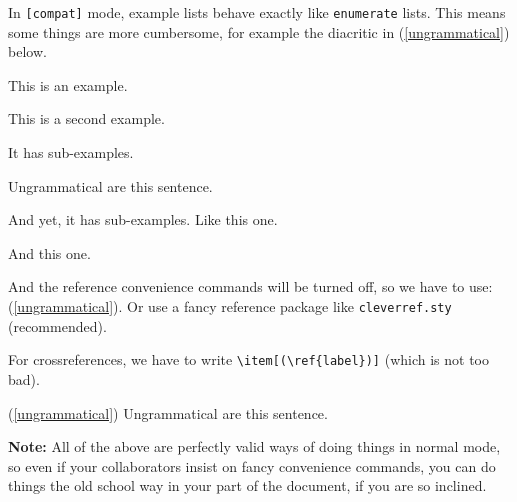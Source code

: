 \documentclass{article}
\begin{document}
%
\noindent In \verb|[compat]| mode, example lists behave exactly
like \verb|enumerate| lists. This means some things are more cumbersome,
for example the diacritic in (\ref{ungrammatical}) below.
    \begin{examples}
        \item This is an example.
        \item This is a second example.
              \begin{examples}
                  \item It has sub-examples.
                  \item \diacritic{*} Ungrammatical are this sentence.\label{ungrammatical}
                        \begin{examples}
                            \item And yet, it has sub-examples. Like this one.
                            \item And this one.
                        \end{examples}
              \end{examples}
    \end{examples}
%
And the reference convenience commands will be turned off, so we have to use: 
(\ref{ungrammatical}). Or use a fancy reference package like \verb|cleverref.sty| (recommended).

For crossreferences, we have to write \verb|\item[(\ref{label})]| (which is not too bad).
\begin{examples}
    \item[(\ref{ungrammatical})] \diacritic{*} Ungrammatical are this sentence.
\end{examples}
%
\textbf{Note:} All of the above are perfectly valid ways of doing things in normal mode,
so even if your collaborators insist on fancy convenience commands, you can do things
the old school way in your part of the document, if you are so inclined.
\end{document}
